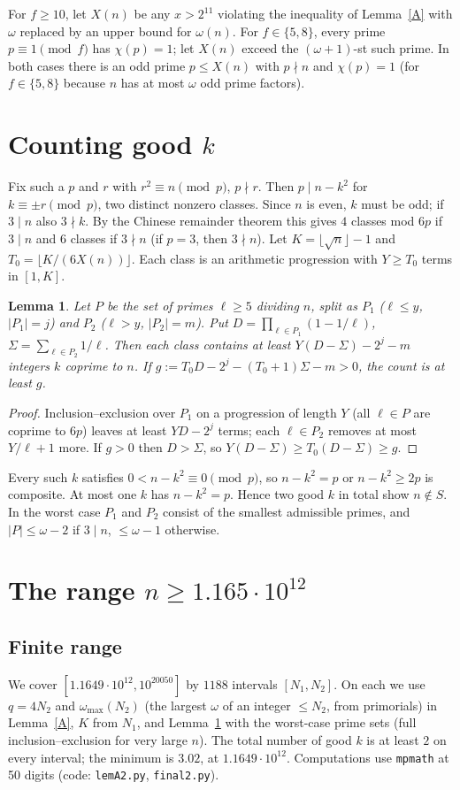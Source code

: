 \documentclass[11pt]{amsart}
\newtheorem{lemma}[theorem]{Lemma}
\theoremstyle{remark}\newtheorem*{remark}{Remark}
\begin{document}
For $f\ge10$, let $X(n)$ be any $x>2^{11}$ violating the inequality of Lemma~\ref{A} with $\omega$ replaced by an upper bound for $\omega(n)$. For $f\in\{5,8\}$, every prime $p\equiv1\pmod f$ has $\chi(p)=1$; let $X(n)$ exceed the $(\omega+1)$-st such prime. In both cases there is an odd prime $p\le X(n)$ with $p\nmid n$ and $\chi(p)=1$ (for $f\in\{5,8\}$ because $n$ has at most $\omega$ odd prime factors).

\section{Counting good $k$}
Fix such a $p$ and $r$ with $r^2\equiv n\pmod p$, $p\nmid r$. Then $p\mid n-k^2$ for $k\equiv\pm r\pmod p$, two distinct nonzero classes. Since $n$ is even, $k$ must be odd; if $3\mid n$ also $3\nmid k$. By the Chinese remainder theorem this gives $4$ classes mod $6p$ if $3\mid n$ and $6$ classes if $3\nmid n$ (if $p=3$, then $3\nmid n$). Let $K=\lfloor\sqrt n\rfloor-1$ and $T_0=\lfloor K/(6X(n))\rfloor$. Each class is an arithmetic progression with $Y\ge T_0$ terms in $[1,K]$.

\begin{lemma}\label{B}
Let $P$ be the set of primes $\ell\ge5$ dividing $n$, split as $P_1$ ($\ell\le y$, $|P_1|=j$) and $P_2$ ($\ell>y$, $|P_2|=m$). Put $D=\prod_{\ell\in P_1}(1-1/\ell)$, $\Sigma=\sum_{\ell\in P_2}1/\ell$. Then each class contains at least $Y(D-\Sigma)-2^j-m$ integers $k$ coprime to $n$. If $g:=T_0D-2^j-(T_0+1)\Sigma-m>0$, the count is at least $g$.
\end{lemma}
\begin{proof}
Inclusion--exclusion over $P_1$ on a progression of length $Y$ (all $\ell\in P$ are coprime to $6p$) leaves at least $YD-2^j$ terms; each $\ell\in P_2$ removes at most $Y/\ell+1$ more. If $g>0$ then $D>\Sigma$, so $Y(D-\Sigma)\ge T_0(D-\Sigma)\ge g$.
\end{proof}
Every such $k$ satisfies $0<n-k^2\equiv0\pmod p$, so $n-k^2=p$ or $n-k^2\ge2p$ is composite. At most one $k$ has $n-k^2=p$. Hence two good $k$ in total show $n\notin S$. In the worst case $P_1$ and $P_2$ consist of the smallest admissible primes, and $|P|\le\omega-2$ if $3\mid n$, $\le\omega-1$ otherwise.

\section{The range $n\ge1.165\cdot10^{12}$}
\subsection*{Finite range} We cover $[1.1649\cdot10^{12},10^{20050}]$ by $1188$ intervals $[N_1,N_2]$. On each we use $q=4N_2$ and $\omega_{\max}(N_2)$ (the largest $\omega$ of an integer $\le N_2$, from primorials) in Lemma~\ref{A}, $K$ from $N_1$, and Lemma~\ref{B} with the worst-case prime sets (full inclusion--exclusion for very large $n$). The total number of good $k$ is at least $2$ on every interval; the minimum is $3.02$, at $1.1649\cdot10^{12}$. Computations use \texttt{mpmath} at 50 digits (code: \texttt{lemA2.py}, \texttt{final2.py}).
\end{document}
